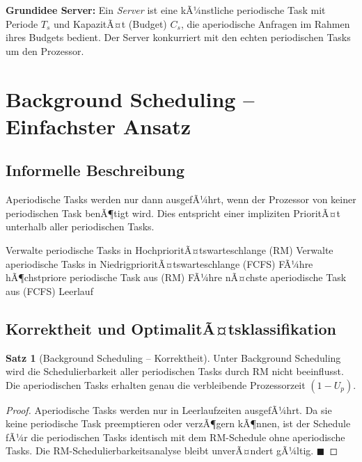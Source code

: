 ﻿\documentclass[a4paper,12pt]{report}
\theoremstyle{definition}
\newtheorem{satz}{Satz}[chapter]
\begin{document}
\textbf{Grundidee Server:} Ein \emph{Server} ist eine kÃ¼nstliche periodische
Task mit Periode $T_s$ und KapazitÃ¤t (Budget) $C_s$, die aperiodische Anfragen
im Rahmen ihres Budgets bedient. Der Server konkurriert mit den echten periodischen
Tasks um den Prozessor.

\section{Background Scheduling -- Einfachster Ansatz}

\subsection{Informelle Beschreibung}

Aperiodische Tasks werden nur dann ausgefÃ¼hrt, wenn der Prozessor von keiner
periodischen Task benÃ¶tigt wird. Dies entspricht einer impliziten PrioritÃ¤t
unterhalb aller periodischen Tasks.

\begin{algorithm}[H]
	\caption{Background Scheduling}
	\begin{algorithmic}[1]
		\State Verwalte periodische Tasks in HochprioritÃ¤tswarteschlange (RM)
		\State Verwalte aperiodische Tasks in NiedrigprioritÃ¤tswarteschlange (FCFS)
		\Loop
		\State FÃ¼hre hÃ¶chstpriore periodische Task aus (RM)
		\State FÃ¼hre nÃ¤chste aperiodische Task aus (FCFS)
		\Else
		\State Leerlauf
		\EndIf
		\EndLoop
	\end{algorithmic}
\end{algorithm}

\subsection{Korrektheit und OptimalitÃ¤tsklassifikation}

\begin{satz}[Background Scheduling -- Korrektheit]
	Unter Background Scheduling wird die Schedulierbarkeit aller periodischen
	Tasks durch RM nicht beeinflusst. Die aperiodischen Tasks erhalten genau
	die verbleibende Prozessorzeit $(1-U_p)$.
\end{satz}

\begin{proof}
	Aperiodische Tasks werden nur in Leerlaufzeiten ausgefÃ¼hrt. Da sie keine
	periodische Task preemptieren oder verzÃ¶gern kÃ¶nnen, ist der Schedule fÃ¼r
	die periodischen Tasks identisch mit dem RM-Schedule ohne aperiodische Tasks.
	Die RM-Schedulierbarkeitsanalyse bleibt unverÃ¤ndert gÃ¼ltig. \hfill$\blacksquare$
\end{proof}
\end{document}
